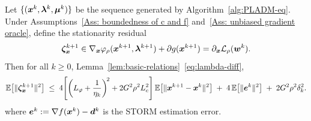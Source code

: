 \documentclass[10pt]{article}
\begin{document}

\begin{lemma}
\label{lem:stationarity}
Let $\{(\bm{x}^k, \bm{\lambda}^k, \bm{\mu}^k)\}$ be the sequence generated by
Algorithm~\ref{alg:PLADM-eq}.
Under Assumptions~\ref{Ass: boundedness of c and f}
and~\ref{Ass: unbiased gradient oracle},
define the stationarity residual
\begin{equation}
    \bm{\zeta}_{\bm{x}}^{k+1} \in \nabla_{\bm{x}}\varphi_\rho(\bm{x}^{k+1}, \bm{\lambda}^{k+1}) 
    + \partial g(\bm{x}^{k+1}) = \partial_{\bm{x}} \mathcal{L}_{\rho}(\bm{w}^k).
\end{equation}Then for all $k \geq 0$,
Lemma~\ref{lem:basic-relations}~\eqref{eq:lambda-diff},
\begin{equation}\label{eq:zeta-expect}
    \mathbb{E}\!\left[\|\bm{\zeta}_{\bm{x}}^{k+1}\|^2\right]
    \;\leq\;
    4\!\left[\left(L_\varphi+\frac{1}{\eta_k}\right)^{\!2}
             + 2G^2\rho^2 L_c^2\right]
    \mathbb{E}\!\left[\|\bm{x}^{k+1}-\bm{x}^k\|^2\right]
    \;+\; 4\,\mathbb{E}\!\left[\|\bm{e}^k\|^2\right]
    \;+\; 2G^2\rho^2\delta_k^2.
\end{equation} where $\bm{e}^k := \nabla f(\bm{x}^k) - \bm{d}^k$ is the STORM estimation error.
\end{lemma}


 
 
\end{document}
